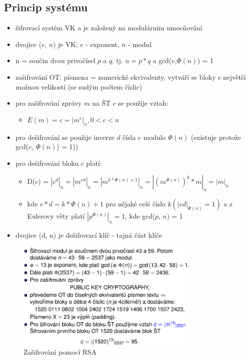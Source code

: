 \documentclass{szzclass}
\begin{document}
\subsection{Princip systému}
\begin{itemize}
    \item šifrovací systém VK a je založený na modulárním umocňování
    \item dvojice ($e$, $n$) je VK; $e$ - exponent, $n$ - modul
    \item n = součin dvou privočísel $p$ a $q$, tj. $n = p*q$ a gcd($e$,$\Phi(n)$) = 1
    \item zašifrování OT: písmena = numerické ekvivalenty, vytváří se bloky s největší možnou velikostí (se sudým počtem číslic)
    \item pro zašifrování zprávy $m$ na ŠT $c$ se použije vztah:
    \begin{itemize}
        \item $E(m) = c = |m^e|_n, 0 < c < n$
    \end{itemize}
    \item pro dešifrování se použije inverze $d$ čísla $e$ modulo $\Phi(n)$ (existuje protože gcd($e$, $\Phi(n)$) = 1))
    \item pro dešifrování bloku $c$ platí:
    \begin{itemize}
        \item D($c$) = $|c^d|_n = |m^{ed}|_n = |m^{k*\Phi(n)+1}|_n = |(m^{\Phi(n)})^k*m|_n = |m|_n$
        \item kde $e*d = k*\Phi(n) + 1$ pro nějaké celé číslo $k (|ed|_{\Phi(n)} = 1)$ a z Eulerovy věty platí $|p^{\Phi(n)}|_n = 1$, kde gcd($p$, $n$) = 1
    \end{itemize}
    \item dvojice (d, n) je dešifrovací klíč - tajná část klíče
\end{itemize}
\begin{figure}[h!]
    \centering
    \includegraphics[width=0.8\textwidth]{topics/bi-spol-06/image/rsaEncrypt.png}
    \caption{Zašifrování pomocí RSA}
\end{figure}
\end{document}
